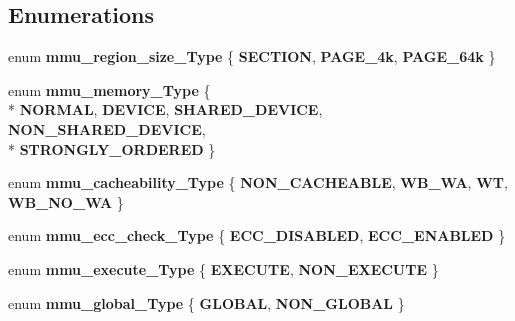 \subsection*{Enumerations}
\begin{DoxyCompactItemize}
\item 
enum {\bfseries mmu\+\_\+region\+\_\+size\+\_\+\+Type} \{ {\bfseries S\+E\+C\+T\+I\+ON}, 
{\bfseries P\+A\+G\+E\+\_\+4k}, 
{\bfseries P\+A\+G\+E\+\_\+64k}
 \}\hypertarget{group__MMU__Functions_gab184b824a6d7cb728bd46c6abcd0c21a}{}\label{group__MMU__Functions_gab184b824a6d7cb728bd46c6abcd0c21a}

\item 
enum {\bfseries mmu\+\_\+memory\+\_\+\+Type} \{ \\*
{\bfseries N\+O\+R\+M\+AL}, 
{\bfseries D\+E\+V\+I\+CE}, 
{\bfseries S\+H\+A\+R\+E\+D\+\_\+\+D\+E\+V\+I\+CE}, 
{\bfseries N\+O\+N\+\_\+\+S\+H\+A\+R\+E\+D\+\_\+\+D\+E\+V\+I\+CE}, 
\\*
{\bfseries S\+T\+R\+O\+N\+G\+L\+Y\+\_\+\+O\+R\+D\+E\+R\+ED}
 \}\hypertarget{group__MMU__Functions_ga83ac8de9263f89879079da521e86d5f2}{}\label{group__MMU__Functions_ga83ac8de9263f89879079da521e86d5f2}

\item 
enum {\bfseries mmu\+\_\+cacheability\+\_\+\+Type} \{ {\bfseries N\+O\+N\+\_\+\+C\+A\+C\+H\+E\+A\+B\+LE}, 
{\bfseries W\+B\+\_\+\+WA}, 
{\bfseries WT}, 
{\bfseries W\+B\+\_\+\+N\+O\+\_\+\+WA}
 \}\hypertarget{group__MMU__Functions_ga11c86b7b193efb2c59b6a2179a02f584}{}\label{group__MMU__Functions_ga11c86b7b193efb2c59b6a2179a02f584}

\item 
enum {\bfseries mmu\+\_\+ecc\+\_\+check\+\_\+\+Type} \{ {\bfseries E\+C\+C\+\_\+\+D\+I\+S\+A\+B\+L\+ED}, 
{\bfseries E\+C\+C\+\_\+\+E\+N\+A\+B\+L\+ED}
 \}\hypertarget{group__MMU__Functions_ga06d94c0eaa22d713636acaff81485409}{}\label{group__MMU__Functions_ga06d94c0eaa22d713636acaff81485409}

\item 
enum {\bfseries mmu\+\_\+execute\+\_\+\+Type} \{ {\bfseries E\+X\+E\+C\+U\+TE}, 
{\bfseries N\+O\+N\+\_\+\+E\+X\+E\+C\+U\+TE}
 \}\hypertarget{group__MMU__Functions_ga2fe1157deda82e66b9a1b19772309b63}{}\label{group__MMU__Functions_ga2fe1157deda82e66b9a1b19772309b63}

\item 
enum {\bfseries mmu\+\_\+global\+\_\+\+Type} \{ {\bfseries G\+L\+O\+B\+AL}, 
{\bfseries N\+O\+N\+\_\+\+G\+L\+O\+B\+AL}
 \}\hypertarget{group__MMU__Functions_ga04160605fbe20914c8ef020430684a30}{}\label{group__MMU__Functions_ga04160605fbe20914c8ef020430684a30}


\end{DoxyCompactItemize}
